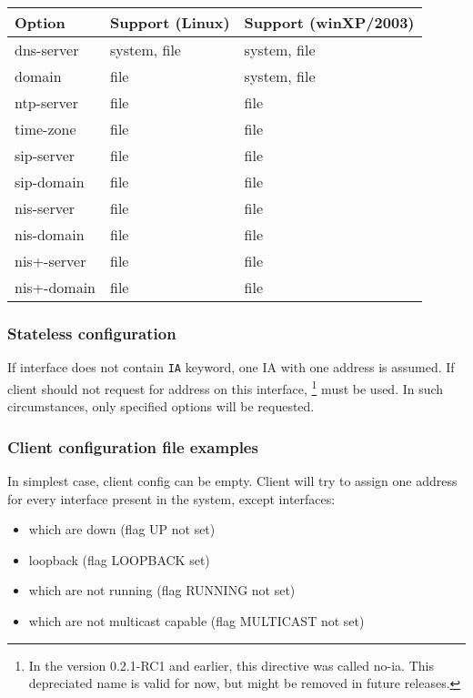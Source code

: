 \begin{center}
\begin{tabular}{|l|l|l|}
\hline
Option & Support (Linux) & Support (winXP/2003)  \\
\hline
dns-server  & system, file & system, file \\
domain      & file         & system, file \\
ntp-server  & file         & file \\
time-zone   & file         & file \\
sip-server  & file         & file \\
sip-domain  & file         & file \\
nis-server  & file         & file \\
nis-domain  & file         & file \\
nis+-server & file         & file \\
nis+-domain & file         & file \\
\hline
\end{tabular}
\end{center}

\subsubsection{Stateless configuration}

If interface does not contain \verb+IA+ keyword, one IA with one address is
assumed. If client should not request for address on this interface,
\footnote{In the version 0.2.1-RC1 and earlier, this
  directive was called no-ia. This depreciated name is valid for now,
  but might be removed in future releases.}
must be used. In such circumstances, only specified options will be
requested.

\subsubsection{Client configuration file examples}

In simplest case, client config can be empty. Client will try to
assign one address for every interface present in the system, except
interfaces:
\begin{itemize}
\item which are down (flag UP not set)
\item loopback (flag LOOPBACK set)
\item which are not running (flag RUNNING not set)
\item which are not multicast capable (flag MULTICAST not set)
\end{itemize}

